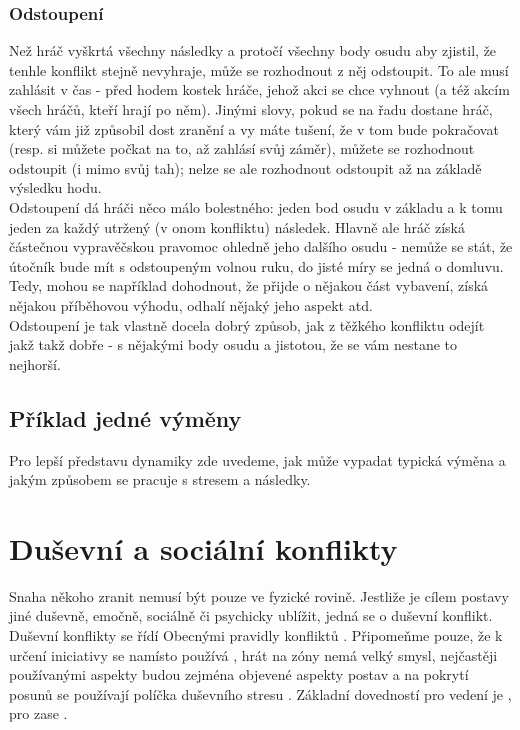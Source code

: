 \documentclass[../main.tex]{subfiles}
\begin{document}
\subsubsection{Odstoupení}
\label{sec:odstoupeni}

Než hráč vyškrtá všechny následky a protočí všechny body osudu aby zjistil, že tenhle konflikt stejně nevyhraje, může se rozhodnout z něj odstoupit. To ale musí zahlásit v čas - před hodem kostek hráče, jehož akci se chce vyhnout (a též akcím všech hráčů, kteří hrají po něm). Jinými slovy, pokud se na řadu dostane hráč, který vám již způsobil dost zranění a vy máte tušení, že v tom bude pokračovat (resp. si můžete počkat na to, až zahlásí svůj záměr), můžete se rozhodnout odstoupit (i mimo svůj tah); nelze se ale rozhodnout odstoupit až na základě výsledku hodu.\\
Odstoupení dá hráči něco málo bolestného: jeden bod osudu v základu a k tomu jeden za každý utržený (v onom konfliktu) následek. Hlavně ale hráč získá částečnou vypravěčskou pravomoc ohledně jeho dalšího osudu - nemůže se stát, že útočník bude mít s odstoupeným volnou ruku, do jisté míry se jedná o domluvu. Tedy, mohou se například dohodnout, že přijde o nějakou část vybavení, získá nějakou příběhovou výhodu, odhalí nějaký jeho aspekt atd. \\
Odstoupení je tak vlastně docela dobrý způsob, jak z těžkého konfliktu odejít jakž takž dobře - s nějakými body osudu a jistotou, že se vám nestane to nejhorší. 

\subsection{Příklad jedné výměny}
\label{sec:priklad-vymena}

Pro lepší představu dynamiky zde uvedeme, jak může vypadat typická výměna a jakým způsobem se pracuje s stresem a následky.

\section{Duševní a sociální konflikty}
\label{sec:dusevni-soc-konflikty}

Snaha někoho zranit nemusí být pouze ve fyzické rovině. Jestliže je cílem postavy jiné duševně, emočně, sociálně či psychicky ublížit, jedná se o duševní konflikt. \\
Duševní konflikty se řídí Obecnými pravidly konfliktů . Připomeňme pouze, že k určení iniciativy  se namísto  používá , hrát na zóny  nemá velký smysl, nejčastěji používanými aspekty budou zejména objevené aspekty postav a na pokrytí posunů se používají políčka duševního stresu . Základní dovedností pro vedení  je , pro  zase .
\end{document}

